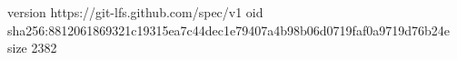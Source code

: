 version https://git-lfs.github.com/spec/v1
oid sha256:8812061869321c19315ea7c44dec1e79407a4b98b06d0719faf0a9719d76b24e
size 2382
